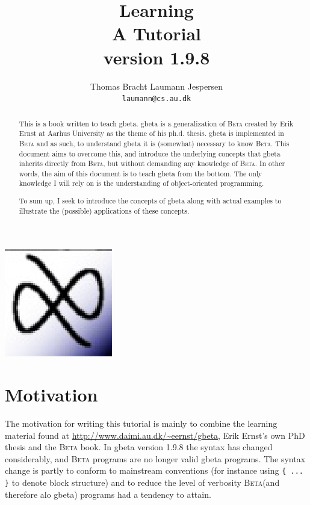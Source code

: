 \documentclass[openany]{memoir}
\author{Thomas Bracht Laumann Jespersen\\ \texttt{laumann@cs.au.dk}}
\title{Learning \gbeta\\ A Tutorial\\\normalsize \gbeta version 1.9.8}
\newcommand{\gbeta}{\textsf{gbeta}\xspace}
\renewcommand{\beta}{\textsc{Beta}\xspace}
\begin{document}
\frontmatter

\maketitle

\begin{center}
  \includegraphics[scale=0.5]{pics/logo.eps}
\end{center}

\begin{abstract}
  This is a book written to teach \gbeta . \gbeta is a generalization
  of \beta created by Erik Ernst at Aarhus University as the theme of
  his ph.d. thesis. \gbeta is implemented in \beta and as such, to
  understand \gbeta it is (somewhat) necessary to know \beta . This
  document aims to overcome this, and introduce the underlying
  concepts that \gbeta inherits directly from \beta , but without
  demanding any knowledge of \beta . In other words, the aim of this
  document is to teach \gbeta from the bottom. The only knowledge I
  will rely on is the understanding of object-oriented
  programming.

  To sum up, I seek to introduce the concepts of \gbeta along with
  actual examples to illustrate the (possible) applications of these
  concepts.

\end{abstract}

\newpage

\tableofcontents

\chapter{Motivation}

The motivation for writing this tutorial is mainly to combine the
learning material found at \url{http://www.daimi.au.dk/~eernst/gbeta},
Erik Ernst's own PhD thesis \cite{ernst99b} and the \beta book. In \gbeta version
1.9.8 the syntax has changed considerably, and \beta programs are
no longer valid \gbeta programs. The syntax change is partly to
conform to mainstream conventions (for instance using \verb|{ ... }| to denote
block structure) and to reduce the level of verbosity \beta (and
therefore alo \gbeta ) programs had a tendency to attain.
\end{document}
